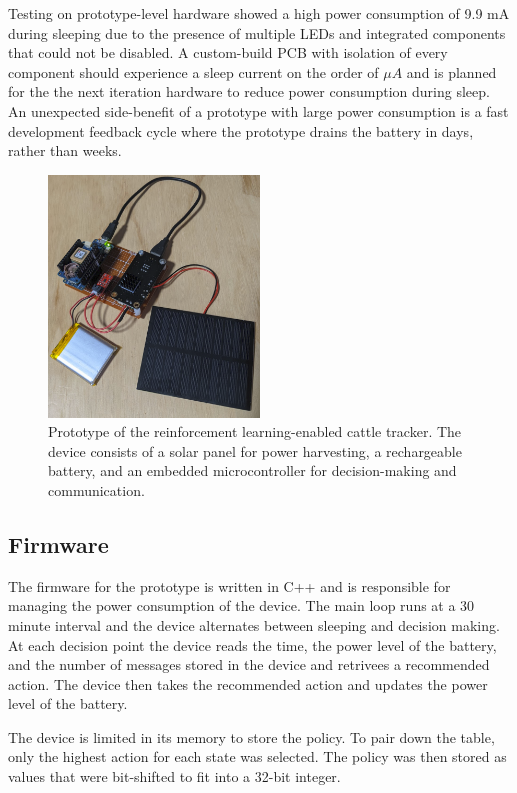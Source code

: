 \documentclass[10pt]{cai}
\begin{document}
Testing on prototype-level hardware showed a high power consumption of 9.9 mA during sleeping due to the presence of multiple LEDs and integrated components that could not be disabled. 
A custom-build PCB with isolation of every component should experience a sleep current on the order of $\mu A$ and is planned for the the next iteration hardware to reduce power consumption during sleep.
An unexpected side-benefit of a prototype with large power consumption is a fast development feedback cycle where the prototype drains the battery in days, rather than weeks. 

\begin{figure}[htbp]
  \centering
  \includegraphics[width=0.5\textwidth]{./figs/prototype.png}
  \caption{Prototype of the reinforcement learning-enabled cattle tracker. The device consists of a solar panel for power harvesting, a rechargeable battery, and an embedded microcontroller for decision-making and communication.}
  \label{fig:prototype}
\end{figure}

\subsection{Firmware}
The firmware for the prototype is written in C++ and is responsible for managing the power consumption of the device.
The main loop runs at a 30 minute interval and the device alternates between sleeping and decision making.
At each decision point the device reads the time, the power level of the battery, and the number of messages stored in the device and retrivees a recommended action.
The device then takes the recommended action and updates the power level of the battery.

The device is limited in its memory to store the policy.
To pair down the table, only the highest action for each state was selected.
The policy was then stored as values that were bit-shifted to fit into a 32-bit integer.
\end{document}
